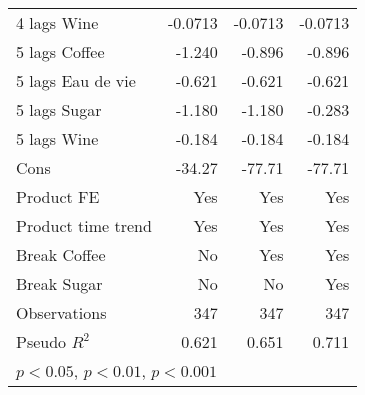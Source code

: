 \begin{table}[htbp]
\begin{tabular}{l*{3}{D{.}{.}{-1}}}
4 lags Wine         &     -0.0713         &     -0.0713         &     -0.0713         \\
5 lags Coffee       &      -1.240\sym{*}  &      -0.896\sym{*}  &      -0.896\sym{*}  \\
5 lags Eau de vie   &      -0.621         &      -0.621         &      -0.621         \\
5 lags Sugar        &      -1.180         &      -1.180         &      -0.283         \\
5 lags Wine         &      -0.184         &      -0.184         &      -0.184         \\
Cons                &      -34.27\sym{**} &      -77.71\sym{***}&      -77.71\sym{***}\\
Product FE          &         Yes         &         Yes         &         Yes         \\
Product time trend  &         Yes         &         Yes         &         Yes         \\
Break Coffee        &          No         &         Yes         &         Yes         \\
Break Sugar         &          No         &          No         &         Yes         \\
\hline
Observations        &         347         &         347         &         347         \\
Pseudo \(R^{2}\)    &       0.621         &       0.651         &       0.711         \\
\hline\hline
{}\\
\end{tabular}
\end{table}
